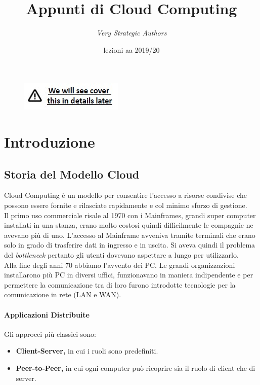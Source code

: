 \documentclass{article}
\title{Appunti di Cloud Computing}
\author{\textit{Very Strategic Authors}}
\date{lezioni aa 2019/20}
\begin{document}
\maketitle

\begin{figure}[H]
    \centering
    \includegraphics[scale=1]{img/cover.jpg}
\end{figure}

\tableofcontents
\newpage

\section{Introduzione}
\subsection{Storia del Modello Cloud}
Cloud Computing è un modello per consentire l’accesso a risorse condivise che possono essere fornite e rilasciate rapidamente e col minimo sforzo di gestione.\\
Il primo uso commerciale risale al 1970 con i Mainframes, grandi super computer installati in una stanza, erano molto costosi quindi difficilmente le compagnie ne avevano più di uno. L’accesso al Mainframe avveniva tramite terminali che erano solo in grado di trasferire dati in ingresso e in uscita. Si aveva quindi il problema del \textit{bottleneck} pertanto gli utenti dovevano aspettare a lungo per utilizzarlo.\\
Alla fine degli anni 70 abbiamo l'avvento dei PC. Le grandi organizzazioni installarono più PC in diversi uffici, funzionavano in maniera indipendente e per permettere la comunicazione tra di loro furono introdotte tecnologie per la comunicazione in rete (LAN e WAN).

\paragraph{Applicazioni Distribuite}
Gli approcci più classici sono:
\begin{itemize}
    \item \textbf{Client-Server,} in cui i ruoli sono predefiniti.
    \item \textbf{Peer-to-Peer,} in cui ogni computer può ricoprire sia il ruolo di client che di server.
\end{itemize}
\end{document}
